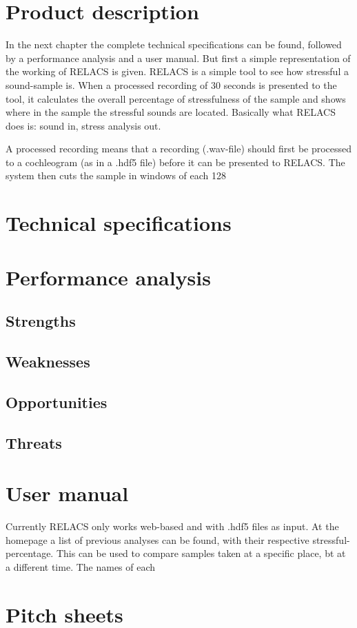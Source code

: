 \documentclass[a4paper]{article}
\begin{document}
\section{Product description}
In the next chapter the complete technical specifications can be found, followed by a performance analysis and a user manual. 
But first a simple representation of the working of RELACS is given. RELACS is a simple tool to see how stressful a sound-sample is. 
When a processed recording of 30 seconds is presented to the tool, it calculates the overall percentage of stressfulness of the sample and shows where in the sample the stressful sounds are located. 
Basically what RELACS does is: sound in, stress analysis out.

A processed recording means that a recording (.wav-file) should first be processed to a cochleogram (as in a .hdf5 file) before it can be presented to RELACS. The system then cuts the sample in windows of each 128

\section{Technical specifications}


\section{Performance analysis}

\subsection{Strengths}
\subsection{Weaknesses}
\subsection{Opportunities}
\subsection{Threats}


\section{User manual}
Currently RELACS only works web-based and with .hdf5 files as input. At the homepage a list of previous analyses can be found, with their respective stressful-percentage. This can be used to compare samples taken at a specific place, bt at a different time. The names of each 



\section{Pitch sheets}
\end{document}
